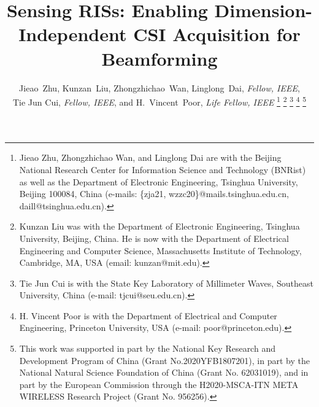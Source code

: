 \documentclass[journal,twocolumn]{IEEEtran}
\theoremstyle{nonumberplain}
\begin{document}
\title{Sensing RISs: Enabling Dimension-Independent CSI Acquisition for Beamforming}
\author{{Jieao~Zhu, Kunzan~Liu, Zhongzhichao~Wan, Linglong~Dai, {\textit{Fellow, IEEE}, \\Tie Jun Cui, {\textit{Fellow, IEEE}}, and H.~Vincent~Poor, {\textit{Life Fellow, IEEE}}}
}
\thanks{Jieao Zhu, Zhongzhichao Wan, and Linglong Dai are with the Beijing National Research Center for Information Science and Technology (BNRist) as well as the Department of Electronic Engineering, Tsinghua University, Beijing 100084, China (e-mails: \{zja21, wzzc20\}@mails.tsinghua.edu.cn, daill@tsinghua.edu.cn).}
\thanks{Kunzan Liu was with the Department of Electronic Engineering, Tsinghua University, Beijing, China. He is now with the Department of Electrical Engineering and Computer Science, Massachusetts Institute of Technology, Cambridge, MA, USA (email: kunzan@mit.edu).}
\thanks{Tie Jun Cui is with the State Key Laboratory of Millimeter Waves, Southeast University, China (e-mail: tjcui@seu.edu.cn).}
\thanks{H. Vincent Poor is with the Department of Electrical and Computer Engineering, Princeton University, USA (e-mail: poor@princeton.edu).}
\thanks{This work was supported in part by the National Key Research and Development Program of China (Grant No.2020YFB1807201), in part by the National Natural Science Foundation of China (Grant No. 62031019), and in part by the European Commission through the H2020-MSCA-ITN META WIRELESS Research Project (Grant No. 956256).}
}

\maketitle
\end{document}
